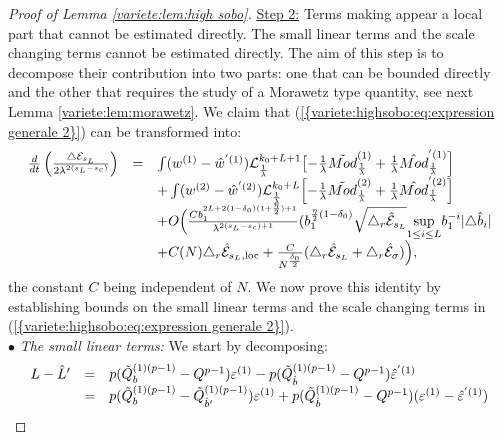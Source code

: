 \documentclass[11pt,a4paper,reqno]{amsart}
\theoremstyle{remark}
\numberwithin{equation}{section}
\begin{document}
\begin{proof}[Proof of Lemma \ref{variete:lem:high sobo}]
\underline{Step 2:} Terms making appear a local part that cannot be estimated directly. The small linear terms and the scale changing terms cannot be estimated directly. The aim of this step is to decompose their contribution into two parts: one that can be bounded directly and the other that requires the study of a Morawetz type quantity, see next Lemma \ref{variete:lem:morawetz}. We claim that {{\rm (\ref{{variete:highsobo:eq:expression generale 2}})}} can be transformed into:
\begin{equation} \label{variete:highsobo:eq:expression derivee step2}
\begin{array}{r c l}
\frac{d}{dt}\left( \frac{\triangle \mathcal{E}_{s_L}}{2\lambda^{2(s_L-s_c)}} \right) &=& \int (w^{(1)}-\hat{w}^{'(1)})\mathcal{L}_{\frac{1}{\lambda}}^{k_0+L+1} \bigl{[}-\frac{1}{\lambda} \tilde{Mod}_{\frac{1}{\lambda}}^{(1)}+\frac{1}{\lambda}\hat{Mod}^{'(1)}_{\frac{1}{\lambda}}  \Bigr{]}\\
&&+\int (w^{(2)}-\hat{w}^{'(2)})\mathcal{L}_{\frac{1}{\lambda}}^{k_0+L} \Bigl{[}-\frac{1}{\lambda} \tilde{Mod}_{\frac{1}{\lambda}}^{(2)}+\frac{1}{\lambda}\hat{Mod}_{\frac{1}{\lambda}}^{'(2)}\Bigr{]}\\
&&+O\Bigl{(}\frac{Cb_1^{2L+2(1-\delta_0)(1+\frac{\eta}{2})+1}}{\lambda^{2(s_L-s_c)+1}}(b_1^{\frac{\eta}{2}(1-\delta_0)}\sqrt{\triangle_r \hat{\mathcal{E}}_{s_L}}\underset{1\leq i \leq L}{\text{sup}}b_1^{-i}|\triangle \hat{b}_i|\\
&&+C(N)\triangle_r \hat{\mathcal{E}}_{s_L,\text{loc}} +\frac{C}{N^{\frac{\delta_0}{2}}}(\triangle_r \hat{\mathcal{E}}_{s_L}+\triangle_r \hat{\mathcal{E}}_{\sigma}) \Bigr{)},\\
\end{array}
\end{equation}
the constant $C$ being independent of $N$. We now prove this identity by establishing bounds on the small linear terms and the scale changing terms in {{\rm (\ref{{variete:highsobo:eq:expression generale 2}})}}. \\
$\bullet$ \emph{The small linear terms:} We start by decomposing:
\begin{equation} \label{variete:highsobo:eq:estimation L expression}
\begin{array}{r c l}
L-\hat{L}'&=&p(\tilde{Q}_{b}^{(1)(p-1)}-Q^{p-1})\varepsilon^{(1)}-p(\tilde{Q}_{\hat{b}}^{(1)(p-1)}-Q^{p-1})\hat{\varepsilon}^{'(1)}\\
&=&p(\tilde{Q}_{b}^{(1)(p-1)}-\tilde{Q}_{\hat{b}'}^{(1)(p-1)})\varepsilon^{(1)}+p(\tilde{Q}_{\hat{b}}^{(1)(p-1)}-Q^{p-1})(\varepsilon^{(1)}-\hat{\varepsilon}^{'(1)})

\end{array}
\end{equation}
\end{proof}
\end{document}
